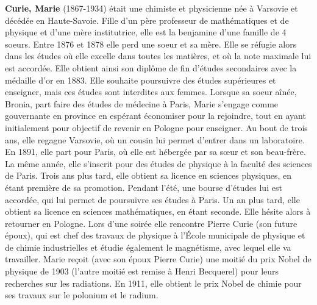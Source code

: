 \textbf{Curie, Marie} (1867-1934) était une chimiste et physicienne née à Varsovie et décédée en Haute-Savoie. Fille d'un père professeur de mathématiques et de physique et d'une mère institutrice, elle est la benjamine d'une famille de 4 soeurs. Entre 1876 et 1878 elle perd une soeur et sa mère. Elle se réfugie alors dans les études où elle excelle dans toutes les matières, et où la note maximale lui est accordée. Elle obtient ainsi son diplôme de fin d'études secondaires avec la médaille d'or en 1883. Elle souhaite poursuivre des études supérieures et enseigner, mais ces études sont interdites aux femmes. Lorsque sa soeur aînée, Bronia, part faire des études de médecine à Paris, Marie s'engage comme gouvernante en province en espérant économiser pour la rejoindre, tout en ayant initialement pour objectif de revenir en Pologne pour enseigner. Au bout de trois ans, elle regagne Varsovie, où un cousin lui permet d'entrer dans un laboratoire. En 1891, elle part pour Paris, où elle est hébergée par sa sœur et son beau-frère. La même année, elle s'inscrit pour des études de physique à la faculté des sciences de Paris. Trois ans plus tard, elle obtient sa licence en sciences physiques, en étant première de sa promotion. Pendant l'été, une bourse d'études lui est accordée, qui lui permet de poursuivre ses études à Paris. Un an plus tard, elle obtient sa licence en sciences mathématiques, en étant seconde. Elle hésite alors à retourner en Pologne. Lors d'une soirée elle rencontre Pierre Curie (son future époux), qui est chef des travaux de physique à l'École municipale de physique et de chimie industrielles et étudie également le magnétisme, avec lequel elle va travailler. Marie reçoit (avec son époux Pierre Curie) une moitié du prix Nobel de physique de 1903 (l'autre moitié est remise à Henri Becquerel) pour leurs recherches sur les radiations. En 1911, elle obtient le prix Nobel de chimie pour ses travaux sur le polonium et le radium.

{}
\label{sec:D}

